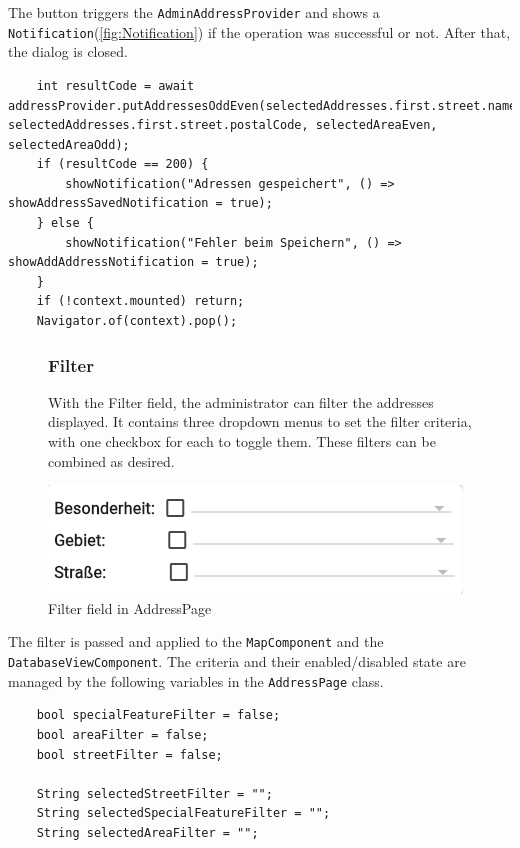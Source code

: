 The button triggers the \texttt{AdminAddressProvider} and shows a \texttt{Notification}(\ref{fig:Notification}) if the operation was successful or not. After that, the dialog is closed.

\lstset{style=mycsharp, caption=onPressed save button in splitStreetDialog}
\begin{lstlisting}
    int resultCode = await addressProvider.putAddressesOddEven(selectedAddresses.first.street.name, selectedAddresses.first.street.postalCode, selectedAreaEven, selectedAreaOdd);
    if (resultCode == 200) {
        showNotification("Adressen gespeichert", () => showAddressSavedNotification = true);
    } else {
        showNotification("Fehler beim Speichern", () => showAddAddressNotification = true);
    }
    if (!context.mounted) return;
    Navigator.of(context).pop();
\end{lstlisting}


\begin{figure}[H]
    \centering
    \begin{minipage}{0.55\textwidth} %
        \subsubsection{Filter}
        With the Filter field, the administrator can filter the addresses displayed. It contains three dropdown menus to set the filter criteria, with one checkbox for each to toggle them. These filters can be combined as desired. 
    \end{minipage}
    \hfill 
    \begin{minipage}{0.4\textwidth} %
        \centering
        \includegraphics[width=\linewidth]{images/AdminPanel/FilterField.png}
        \caption{Filter field in AddressPage}
        \label{fig:adminpanel_filter}
    \end{minipage}
\end{figure}

The filter is passed and applied to the \texttt{MapComponent} and the \texttt{DatabaseViewComponent}. The criteria and their enabled/disabled state are managed by the following variables in the \texttt{AddressPage} class.
\lstset{style=mycsharp, caption=Filter variables in AddressPage}
\begin{lstlisting}
    bool specialFeatureFilter = false;
    bool areaFilter = false;
    bool streetFilter = false;
    
    String selectedStreetFilter = "";
    String selectedSpecialFeatureFilter = "";
    String selectedAreaFilter = "";
\end{lstlisting}

